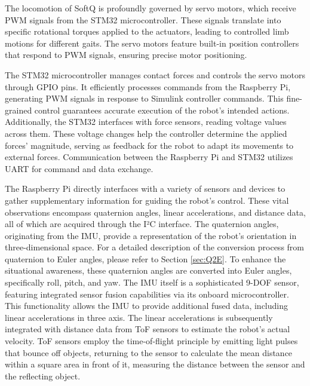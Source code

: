 The locomotion of SoftQ is profoundly governed by servo motors, which receive \ac{PWM} signals from the STM32 microcontroller. These signals translate into specific rotational torques applied to the actuators, leading to controlled limb motions for different gaits. The servo motors feature built-in position controllers that respond to PWM signals, ensuring precise motor positioning.

The STM32 microcontroller manages contact forces and controls the servo motors through \ac{GPIO} pins. It efficiently processes commands from the Raspberry Pi, generating PWM signals in response to Simulink controller commands. This fine-grained control guarantees accurate execution of the robot's intended actions. Additionally, the STM32 interfaces with force sensors, reading voltage values across them. These voltage changes help the controller determine the applied forces' magnitude, serving as feedback for the robot to adapt its movements to external forces. Communication between the Raspberry Pi and STM32 utilizes \ac{UART} for command and data exchange.

The Raspberry Pi directly interfaces with a variety of sensors and devices to gather supplementary information for guiding the robot's control. These vital observations encompass quaternion angles, linear accelerations, and distance data, all of which are acquired through the \ac{I²C} interface. The quaternion angles, originating from the \ac{IMU}, provide a representation of the robot's orientation in three-dimensional space. For a detailed description of the conversion process from quaternion to Euler angles, please refer to Section \ref{sec:Q2E}. To enhance the situational awareness, these quaternion angles are converted into Euler angles, specifically roll, pitch, and yaw. The IMU itself is a sophisticated 9-DOF sensor, featuring integrated sensor fusion capabilities via its onboard microcontroller. This functionality allows the IMU to provide additional fused data, including linear accelerations in three axis. The linear accelerations is subsequently integrated with distance data from \ac{ToF} sensors to estimate the robot's actual velocity. ToF sensors employ the time-of-flight principle by emitting light pulses that bounce off objects, returning to the sensor to calculate the mean distance within a square area in front of it, measuring the distance between the sensor and the reflecting object.

